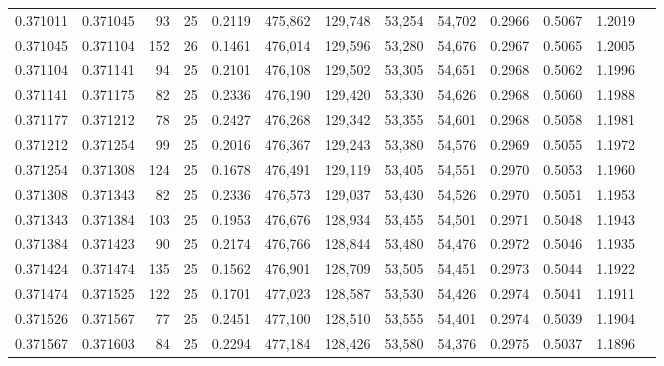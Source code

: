 \begin{tabular}{rrrrrrrrrrrrr}
0.371011 & 0.371045 &    93 &  25 &                                     0.2119 & 475,862 & 129,748 &  53,254 &  54,702 & 0.2966 & 0.5067 & 1.2019 \\
0.371045 & 0.371104 &   152 &  26 &                                     0.1461 & 476,014 & 129,596 &  53,280 &  54,676 & 0.2967 & 0.5065 & 1.2005 \\
0.371104 & 0.371141 &    94 &  25 &                                     0.2101 & 476,108 & 129,502 &  53,305 &  54,651 & 0.2968 & 0.5062 & 1.1996 \\
0.371141 & 0.371175 &    82 &  25 &                                     0.2336 & 476,190 & 129,420 &  53,330 &  54,626 & 0.2968 & 0.5060 & 1.1988 \\
0.371177 & 0.371212 &    78 &  25 &                                     0.2427 & 476,268 & 129,342 &  53,355 &  54,601 & 0.2968 & 0.5058 & 1.1981 \\
0.371212 & 0.371254 &    99 &  25 &                                     0.2016 & 476,367 & 129,243 &  53,380 &  54,576 & 0.2969 & 0.5055 & 1.1972 \\
0.371254 & 0.371308 &   124 &  25 &                                     0.1678 & 476,491 & 129,119 &  53,405 &  54,551 & 0.2970 & 0.5053 & 1.1960 \\
0.371308 & 0.371343 &    82 &  25 &                                     0.2336 & 476,573 & 129,037 &  53,430 &  54,526 & 0.2970 & 0.5051 & 1.1953 \\
0.371343 & 0.371384 &   103 &  25 &                                     0.1953 & 476,676 & 128,934 &  53,455 &  54,501 & 0.2971 & 0.5048 & 1.1943 \\
0.371384 & 0.371423 &    90 &  25 &                                     0.2174 & 476,766 & 128,844 &  53,480 &  54,476 & 0.2972 & 0.5046 & 1.1935 \\
0.371424 & 0.371474 &   135 &  25 &                                     0.1562 & 476,901 & 128,709 &  53,505 &  54,451 & 0.2973 & 0.5044 & 1.1922 \\
0.371474 & 0.371525 &   122 &  25 &                                     0.1701 & 477,023 & 128,587 &  53,530 &  54,426 & 0.2974 & 0.5041 & 1.1911 \\
0.371526 & 0.371567 &    77 &  25 &                                     0.2451 & 477,100 & 128,510 &  53,555 &  54,401 & 0.2974 & 0.5039 & 1.1904 \\
0.371567 & 0.371603 &    84 &  25 &                                     0.2294 & 477,184 & 128,426 &  53,580 &  54,376 & 0.2975 & 0.5037 & 1.1896 \\

\end{tabular}
